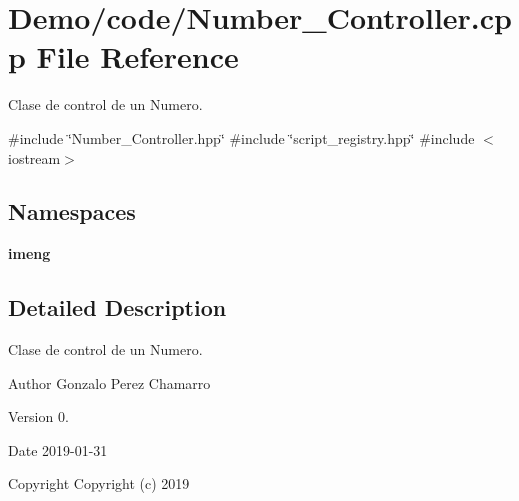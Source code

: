 \section{Demo/code/\+Number\+\_\+\+Controller.cpp File Reference}
\label{_number___controller_8cpp}


Clase de control de un Numero.  


{\ttfamily \#include \char`\"{}Number\+\_\+\+Controller.\+hpp\char`\"{}}\newline
{\ttfamily \#include \char`\"{}script\+\_\+registry.\+hpp\char`\"{}}\newline
{\ttfamily \#include $<$iostream$>$}\newline
\subsection*{Namespaces}
\begin{DoxyCompactItemize}
\item 
 \textbf{ imeng}
\end{DoxyCompactItemize}


\subsection{Detailed Description}
Clase de control de un Numero. 

\begin{DoxyAuthor}{Author}
Gonzalo Perez Chamarro 
\end{DoxyAuthor}
\begin{DoxyVersion}{Version}
0. 
\end{DoxyVersion}
\begin{DoxyDate}{Date}
2019-\/01-\/31
\end{DoxyDate}
\begin{DoxyCopyright}{Copyright}
Copyright (c) 2019 
\end{DoxyCopyright}
